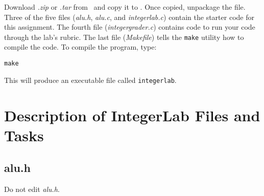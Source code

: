 Download \textit{\shortlabname.zip} or \textit{\shortlabname.tar} from
\filesource\ and copy it to \runtimeenvironment. Once copied, unpackage the
file. Three of the five files (\textit{alu.h}, \textit{alu.c}, and
\textit{integerlab.c}) contain the starter code for this assignment. The fourth
file (\textit{integergrader.c}) contains code to run your code through the lab's
rubric. The last file (\textit{Makefile}) tells the \texttt{make} utility how
to compile the code. To compile the program, type:

\texttt{make}

This will produce an executable file called \texttt{integerlab}.
%

\section{Description of IntegerLab Files and Tasks}

\subsection{alu.h}

Do not edit \textit{alu.h}.

